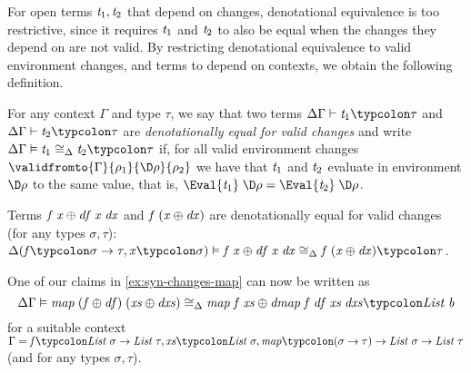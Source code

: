 For open terms \ensuremath{\Varid{t}_{1},\Varid{t}_{2}} that depend on changes,
denotational equivalence is too restrictive, since it
requires \ensuremath{\Varid{t}_{1}} and \ensuremath{\Varid{t}_{2}} to also be equal when the changes they
depend on are not valid.
By restricting denotational equivalence to valid environment
changes, and terms to depend on contexts, we obtain the following definition.
\begin{definition}
  \label{def:denot-equivalence-valid-changes}
  For any context \ensuremath{\Gamma} and type \ensuremath{\tau},
  we say that two terms \ensuremath{\Delta \Gamma\vdash\Varid{t}_{1}\typcolon\tau} and \ensuremath{\Delta \Gamma\vdash\Varid{t}_{2}\typcolon\tau} are \emph{denotationally equal for valid changes} and
  write \ensuremath{\Delta \Gamma\vDash\Varid{t}_{1}\mathrel{\cong_\Delta}\Varid{t}_{2}\typcolon\tau} if, for all valid
  environment changes \ensuremath{\validfromto{\Gamma}{\rho_{1}}{\D\rho}{\rho_{2}}} we have that
  \ensuremath{\Varid{t}_{1}} and \ensuremath{\Varid{t}_{2}} evaluate in environment \ensuremath{\D\rho} to the same value,
  that is, \ensuremath{\Eval{\Varid{t}_{1}}\;\D\rho\mathrel{=}\Eval{\Varid{t}_{2}}\;\D\rho}.
\end{definition}

\begin{example}
  Terms \ensuremath{\Varid{f}\;\Varid{x}\oplus \Varid{df}\;\Varid{x}\;\Varid{dx}} and \ensuremath{\Varid{f}\;(\Varid{x}\oplus \Varid{dx})} are
denotationally equal for valid changes (for any types
\ensuremath{\sigma,\tau}):
\ensuremath{\Delta (\Varid{f}\typcolon\sigma\to \tau,\Varid{x}\typcolon\sigma)\vDash\Varid{f}\;\Varid{x}\oplus \Varid{df}\;\Varid{x}\;\Varid{dx}\mathrel{\cong_\Delta}\Varid{f}\;(\Varid{x}\oplus \Varid{dx})\typcolon\tau}.
\end{example}
\begin{example}
One of our claims in \cref{ex:syn-changes-map} can now be written
as
\[\ensuremath{\Delta \Gamma\vDash\Varid{map}\;(\Varid{f}\oplus \Varid{df})\;(\Varid{xs}\oplus \Varid{dxs})\mathrel{\cong_\Delta}\Varid{map}\;\Varid{f}\;\Varid{xs}\oplus \Varid{dmap}\;\Varid{f}\;\Varid{df}\;\Varid{xs}\;\Varid{dxs}\typcolon\Conid{List}\;\Varid{b}}\]
for a suitable context \ensuremath{\Gamma\mathrel{=}\Varid{f}\typcolon\Conid{List}\;\sigma\to \Conid{List}\;\tau,\Varid{xs}\typcolon\Conid{List}\;\sigma,\Varid{map}\typcolon(\sigma\to \tau)\to \Conid{List}\;\sigma\to \Conid{List}\;\tau} (and for
any types \ensuremath{\sigma,\tau}).
\end{example}

